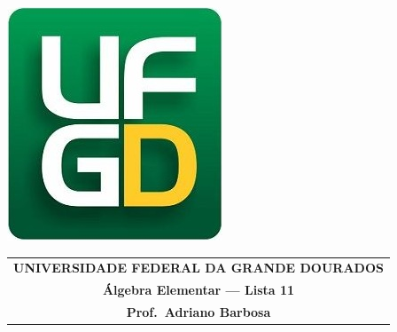 \documentclass[a4paper,5pt]{amsbook}
\begin{document}
\thispagestyle{empty}
\pagestyle{empty}
\begin{minipage}[h]{0.14\textwidth}
	\includegraphics[scale=0.24]{../ufgd.png}
\end{minipage}
\begin{minipage}[h]{\textwidth}
\begin{tabular}{c}
{{\bf UNIVERSIDADE FEDERAL DA GRANDE DOURADOS}}\\
{{\bf \'Algebra Elementar --- Lista 11}}\\
{{\bf Prof.\ Adriano Barbosa}}\\
\end{tabular}
\vspace{-0.45cm}
%
\end{minipage}

\end{document}

